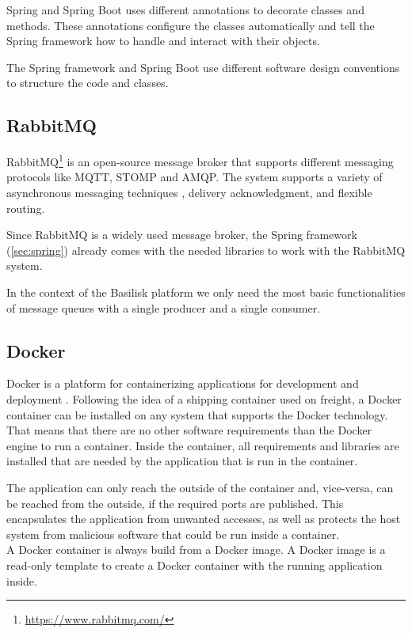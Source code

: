 Spring and Spring Boot uses different annotations to decorate classes and methods.
These annotations configure the classes automatically and tell the Spring framework how to handle and interact with their objects.

The Spring framework and Spring Boot use different software design conventions to structure the code and classes.


\subsection{RabbitMQ}
\label{sec:rabbitmq}
RabbitMQ\footnote{\url{https://www.rabbitmq.com/}} is an open-source message broker that supports different messaging protocols like MQTT, STOMP and AMQP.
The system supports a variety of asynchronous messaging techniques \eg, delivery acknowledgment, and flexible routing.

Since RabbitMQ is a widely used message broker, the Spring framework (\ref{sec:spring}) already comes with the needed libraries to work with the RabbitMQ system.

In the context of the Basilisk platform we only need the most basic functionalities of message queues with a single producer and a single consumer.


\subsection{Docker}
Docker is a platform for containerizing applications for development and deployment \cite{DockerOverviewHttps2022}.
Following the idea of a shipping container used on freight, a Docker container can be installed on any system that supports the Docker technology.
That means that there are no other software requirements than the Docker engine to run a container.
Inside the container, all requirements and libraries are installed that are needed by the application that is run in the container.

The application can only reach the outside of the container and, vice-versa, can be reached from the outside, if the required ports are published.
This encapsulates the application from unwanted accesses, as well as protects the host system from malicious software that could be run inside a container.
\\

A Docker container is always build from a Docker image.
A Docker image is a read-only template to create a Docker container with the running application inside.

